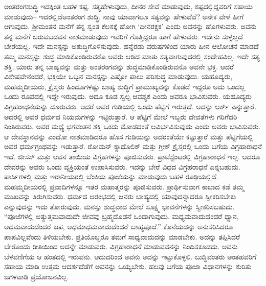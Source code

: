 ಅಂತರಂಗಶುದ್ಧಿ ಇದಕ್ಕಿಂತ ಬಹಳ ಕಷ್ಟ. ಸತ್ಯಹೇಳುವುದು, ದೀನರ ಸೇವೆ ಮಾಡುವುದು, ಕಷ್ಟದಲ್ಲಿದ್ದವರಿಗೆ ಸಹಾಯ ಮಾಡುವುದು– ಇದರಲ್ಲಿದೆ\break ಅಂತರಂಗ ಶುದ್ಧಿ. ನಾವು ಯಾವಾಗಲೂ ಸತ್ಯವನ್ನು ಹೇಳುವೆವೆ? ಅನೇಕ ವೇಳೆ ಹೀಗೆ ಆಗುವುದು. ಶ‍್ರೀಮಂತನ ಮನೆಗೆ ತನ್ನ ಸ್ವಂತ ಕೆಲಸಕ್ಕೆ ಹೋಗಿ ‘ದೀನರಕ್ಷಕ’ ಎಂದು ಅವನನ್ನು ಹೊಗಳುವರು. ಅವನು ತನ್ನ ಮನೆಗೆ ಬರುವ\break ಬಡವನ ನಾಶಮಾಡುವುದು ಇವರಿಗೆ ಗೊತ್ತಿದ್ದರೂ ಹಾಗೆ ಹೇಳುವರು. ಇದೇನು ಸುಳ್ಳಲ್ಲದೆ ಬೇರೆಯಲ್ಲ. ಇದೇ ಮನಸ್ಸನ್ನು ಅಶುದ್ಧಿಗೊಳಿಸುವುದು. ಹನ್ನೆರಡು ವರುಷಗಳಿಂದ ಯಾರು ಹೀನ ಆಲೋಚನೆ ಮಾಡದೆ ತಮ್ಮ ಮನಸ್ಸನ್ನು ಶುದ್ಧ ಮಾಡಿಕೊಂಡಿರುವರೊ ಅವರು ಆಡಿದ ಮಾತು ಸತ್ಯವಾಗುವುದರಲ್ಲಿ ಸಂದೇಹವಿಲ್ಲ. ಇದೇ ಸತ್ಯ ಶಕ್ತಿ. ಯಾರು ತನ್ನ ಬಾಹ್ಯವನ್ನು ಮತ್ತು ಅಂತರಂಗವನ್ನು ಶುದ್ಧಮಾಡಿಕೊಂಡಿರುವನೊ ಅವನೇ ಭಕ್ತ. ಆದರೆ ವಿಶೇಷವೇನೆಂದರೆ, ಭಕ್ತಿಯೇ ಒಬ್ಬನ ಮನಸ್ಸನ್ನು ಎಷ್ಟೋ ಪಾಲು ಪರಿಶುದ್ಧ ಮಾಡುವುದು. ಯಹೂದ್ಯರು, ಮಹಮ್ಮದೀಯರು, ಕ್ರೈಸ್ತರು ಹಿಂದೂಗಳಷ್ಟು ಬಾಹ್ಯ ಶುದ್ಧಿಗೆ ಪ್ರಾಮುಖ್ಯವನ್ನು ಕೊಡದೆ ಇದ್ದರೂ ಅದು ಒಂದಲ್ಲ ಒಂದು ರೂಪದಲ್ಲಿ ಇದ್ದೇ ಇರುವುದು. ಅದೂ ಕೂಡ ಸ್ವಲ್ಪ ಆವಶ್ಯಕ ಎಂದು ಅವರೂ ಭಾವಿಸುವರು. ಯಹೂದ್ಯರು ವಿಗ್ರಹರಾಧನೆಯನ್ನು ದೂರುವರು. ಆದರೆ ಅವರ ಗುಡಿಯಲ್ಲಿ ಒಂದು ಪೆಟ್ಟಿಗೆ ಇರುತ್ತದೆ. ಅದನ್ನು ಆರ್ಕ್​ ಎನ್ನುತ್ತಾರೆ. ಅದರಲ್ಲಿ ಅವರ ಧರ್ಮದ ನಿಯಮಗಳನ್ನು ಇಟ್ಟಿರುತ್ತಾರೆ. ಆ ಪೆಟ್ಟಿಗೆ ಮೇಲೆ ಇಬ್ಬರು ದೇವತೆಗಳು ಗರಿಗೆದರಿ ನಿಂತಿರುವರು. ಅವರ ಮಧ್ಯೆ ಭಗವಂತನ ಶಕ್ತಿ ಒಂದು ಮೋಡದಂತೆ ಆವಿರ್ಭವಿಸುವುದು ಎಂದು ಅವರು ಭಾವಿಸುವರು. ಆ ದೇವಸ್ಥಾನವನ್ನು ಎಂದೋ ನಾಶಮಾಡಿದರೂ ಹೊಸ ಗುಡಿಯನ್ನು ಅದರಂತೆಯೇ ಕಟ್ಟುತ್ತಾರೆ ಮತ್ತು ಪೆಟ್ಟಿಗೆಯಲ್ಲಿ ಅವರ ಧರ್ಮಗ್ರಂಥವನ್ನು ಇಡುತ್ತಾರೆ. ರೋಮನ್​ ಕ್ಯಾಥೊಲಿಕ್​ ಮತ್ತು ಗ್ರೀಕ್​ ಕ್ರೈಸ್ತರಲ್ಲಿ ಒಂದು ಬಗೆಯ ವಿಗ್ರಹಾರಾಧನೆ ಇದೆ. ಜೀಸಸ್​ ಮತ್ತು ಆವನ ತಾಯಿಯ ವಿಗ್ರಹಗಳನ್ನು ಪೂಜಿಸುವರು. ಪ್ರಾಟೆಸ್ಟೆಂಟರಲ್ಲಿ ವಿಗ್ರಹಾರಾಧನೆ ಇಲ್ಲ. ಆದರೂ ದೇವರನ್ನು ಅವರು ಒಂದು ವ್ಯಕ್ತಿಯಂತೆ ಉಪಾಸಿಸುವರು. ಇದನ್ನು ಬೇರೆ ವಿಧದ ವಿಗ್ರಹರಾಧನೆ ಎನ್ನಬಹುದು. ಪಾರ್ಸಿಗಳಲ್ಲಿ ಮತ್ತು ಇರಾನೀಯರಲ್ಲಿ ಬೆಂಕಿಯ ಪೂಜೆಯನ್ನು ಮಾಡುವುದು ಬಹಳ ರೂಢಿಯಲ್ಲಿದೆ. ಮಹಮ್ಮದೀಯರಲ್ಲಿ ಪ್ರವಾದಿಗಳನ್ನೂ ಇತರ ಮಹಾತ್ಮರನ್ನು ಪೂಜಿಸುವರು. ಪ್ರಾರ್ಥಿಸುವಾಗ ಕಾಬಾದ ಕಡೆ ತಮ್ಮ ಮುಖವನ್ನು ತಿರುಗಿಸುವರು. ಧರ್ಮದ ಆರಂಭದಲ್ಲಿ ಜನರು ಬಾಹ್ಯದಲ್ಲಿ ಯಾವುದನ್ನಾದರೂ ಸ್ವೀಕರಿಸಬೇಕು ಎನ್ನುವುದನ್ನು ಇದು ತೋರುವುದು. ಮನಸ್ಸು ಶುದ್ಧವಾದ ಮೇಲೆ ಸೂಕ್ಷ್ಮ ಭಾವನೆಗಳನ್ನು ಸ್ವೀಕರಿಸಬಹುದು. “ಪೂಜೆಗಳಲ್ಲಿ ಅತ್ಯುತ್ತಮವಾದುದೇ ಜೀವವು ಬ್ರಹ್ಮದೊಡನೆ ಒಂದಾಗುವುದು. ಮಧ್ಯಮವಾದುದೆಂದರೆ ಧ್ಯಾನ, ಅಧಮವಾದುದೆಂದರೆ ಜಪ, ಅಧಮಾಧಮವಾದುದೆಂದರೆ ಬಾಹ್ಯಪೂಜೆ.” ಕೊನೆಯದನ್ನು ಅನುಸರಿಸಿದರೂ ಪಾಪವಿಲ್ಲವೆಂದು ತಿಳಿಯಬೇಕು. ಪ್ರತಿಯೊಬ್ಬರೂ ತಮಗೆ ಸಾಧ್ಯವಾದುದನ್ನು ಮಾಡಬೇಕು. ಅದನ್ನು ತಪ್ಪಿಸಿದರೆ ಬೇರೊಂದು ರೀತಿಯಿಂದ ಅದನ್ನೇ ಮಾಡುವರು. ವಿಗ್ರಹಾರಾಧನೆ ಮಾಡುವವನನ್ನು ನಿಂದಿಸಕೂಡದು. ಅವನು ಬೆಳವಣಿಗೆಯ ಆ ಹಂತದಲ್ಲಿ ಇರುವನು. ಆದುದರಿಂದ ಅವನು ಅದನ್ನು ಇಟ್ಟುಕೊಳ್ಳಲಿ. ಬುದ್ಧಿವಂತರು ಅಂತಹವರಿಗೆ ಸಹಾಯ ಮಾಡಿ ಉತ್ತಮ ಆದರ್ಶದೆಡೆಗೆ ಅವನನ್ನು ಒಯ್ಯಬೇಕು. ಹಲವು ಬಗೆಯ ಪೂಜಾ ವಿಧಾನಗಳನ್ನು ಕುರಿತು ಜಗಳವಾಡಿ ಪ್ರಯೋಜನವಿಲ್ಲ.

